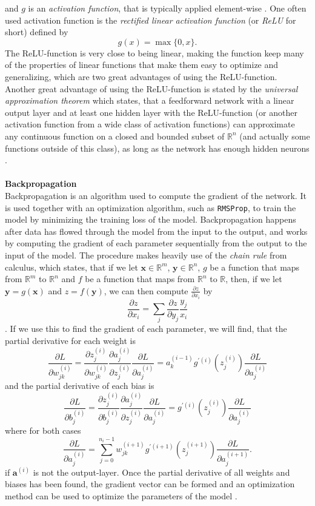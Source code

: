 \documentclass[./main.tex]{subfiles}
\begin{document}
and $g$ is an \textit{activation function}, that is typically applied element-wise \cite{DeepLearning} \cite{3b1b_1}. One often used activation function is the \textit{rectified linear activation function} (or \textit{ReLU} for short) defined by
$$g(x) = \max\{0, x\}.$$
The ReLU-function is very close to being linear, making the function keep many of the properties of linear functions that make them easy to optimize and generalizing, which are two great advantages of using the ReLU-function. Another great advantage of using the ReLU-function is stated by the \textit{universal approximation theorem} which states, that a feedforward network with a linear output layer and at least one hidden layer with the ReLU-function (or another activation function from a wide class of activation functions) can approximate any continuous function on a closed and bounded subset of $\mathbb{R}^n$ (and actually some functions outside of this class), as long as the network has enough hidden neurons \cite{DeepLearning}. 
\\
\\
\noindent \textbf{Backpropagation} \\
Backpropagation is an algorithm used to compute the gradient of the network. It is used together with an optimization algorithm, such as \texttt{RMSProp}, to train the model by minimizing the training loss of the model. Backpropagation happens after data has flowed through the model from the input to the output, and works by computing the gradient of each parameter sequentially from the output to the input of the model. The procedure makes heavily use of the \textit{chain rule} from calculus, which states, that if we let $\bm{x} \in \mathbb{R}^m$, $\bm{y} \in \mathbb{R}^n$, $g$ be a function that maps from $\mathbb{R}^m$ to $\mathbb{R}^n$ and $f$ be a function that maps from $\mathbb{R}^n$ to $\mathbb{R}$, then, if we let $\bm{y} = g(\bm{x})$ and $z = f(\bm{y})$, we can then compute $\frac{\partial z}{\partial x_i}$ by
$$\frac{\partial z}{\partial x_i} = \sum_j \frac{\partial z}{\partial y_j} \frac{y_j}{x_i}$$
\cite{DeepLearning}. If we use this to find the gradient of each parameter, we will find, that the partial derivative for each weight is
$$\frac{\partial L}{\partial w_{jk} ^{(i)}} = \frac{\partial z_j ^{(i)}}{\partial w_{jk} ^{(i)}} \frac{\partial a_j ^{(i)}}{\partial z_j ^{(i)}} \frac{\partial L}{\partial a_j ^{(i)}} = a_k ^{(i - 1)} g ^{\prime (i)} \left( z_j ^{(i)} \right) \frac{\partial L}{\partial a_j ^{(i)}}$$
and the partial derivative of each bias is
$$\frac{\partial L}{\partial b^{(i)} _j} = \frac{\partial z^{(i)} _j}{\partial b^{(i)} _j} \frac{\partial a_j ^{(i)}}{\partial z^{(i)} _j} \frac{\partial L}{\partial a_j ^{(i)}} = g^{\prime (i)} \left( z_j ^{(i)} \right) \frac{\partial L}{\partial a_j ^{(i)}}$$
where for both cases
$$ \frac{\partial L}{\partial a_j ^{(i)}} = \sum_{j = 0} ^{n_i - 1} w_{jk} ^{(i + 1)} g^{\prime (i + 1)} \left( z_j ^{(i + 1)} \right) \frac{\partial L}{\partial a_j ^{(i + 1)}}.$$
if $\bm{a}^{(i)}$ is not the output-layer. Once the partial derivative of all weights and biases has been found, the gradient vector can be formed and an optimization method can be used to optimize the parameters of the model \cite{3b1b_4}.
\end{document}
